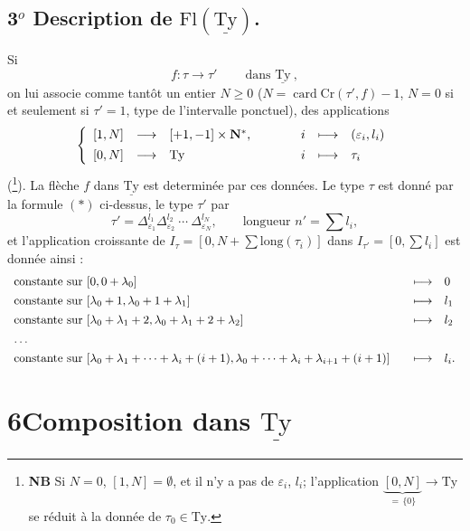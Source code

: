 \documentclass[11pt]{article}
\newcommand{\printedpage}[1]{\marginpar{\footnotesize p.~#1}}
\newcommand{\msp}[1]{\marginpar{\footnotesize [#1]}}
\newcommand{\Ty}{\mathrm{Ty}}
\newcommand{\uTy}{\underline{\mathrm{Ty}}}
\begin{document}
\subsection*{3$^o$ Description de $\mathrm{Fl}(\uTy)$.}

Si
\[
f : \tau \longrightarrow \tau' \qquad \ \text{dans } \uTy\ ,
\]
on lui associe comme tantôt un entier \underline{$N \geq 0$} ($N = \operatorname{card}\mathrm{Cr}(\tau', f){-}1$, $N = 0$ si et seulement si $\tau' = 1$, type de l'intervalle ponctuel), des applications
\[
\left\{
\begin{array}{lcl@{\qquad\qquad}ccl}
{[1,N]} & \longrightarrow & [+1,-1] \times \mathbf{N}^*, & i & \longmapsto & (\varepsilon_i, l_i) \\[1ex]
{[0,N]} & \longrightarrow & \Ty & i & \longmapsto & \tau_i
\end{array}
\right.
\]
(\footnote[14]{\textbf{NB} Si $N = 0$, $[1,N] = \emptyset$, et il n'y a pas de $\varepsilon_i$, $l_i$; l'application $\underbrace{[0,N]}_{=\,\{0\}} \longrightarrow \Ty$ se réduit à la donnée de $\tau_0 \in \Ty$.}). La flèche $f$ dans $\uTy$ est determinée par ces données. Le type $\tau$ est donné par la formule $(*)$ ci-dessus, le type $\tau'$ par %
\[
\tau' = \Delta^{l_1}_{\varepsilon_1} \Delta^{l_2}_{\varepsilon_2}\ \cdots\ \Delta^{l_N}_{\varepsilon_N}, \qquad \text{longueur } n' = \textstyle\sum l_i, \tag*{$(*')$}
\]
\printedpage{31}
et l'application croissante de $I_\tau = [0, N + \sum \mathrm{long}(\tau_i)]$ dans $I_{\tau'} = [0, \sum l_i]$ est donnée ainsi :
\[
\begin{array}{l@{\qquad}cl}
\text{constante sur } [0, 0+\lambda_0] & \longmapsto & 0 \\[1ex]
\text{constante sur } [\lambda_0+1, \lambda_0+1+\lambda_1] & \longmapsto & l_1 \\[1ex]
\text{constante sur } [\lambda_0+\lambda_1+2, \lambda_0+\lambda_1+2+\lambda_2] & \longmapsto & l_2 \\[1ex]
\ldots & & \\[1ex]
\text{constante sur } [\lambda_0+\lambda_1+\cdots+\lambda_i+(i+1), \lambda_0+\cdots+\lambda_i+\lambda_{i+1}+(i+1)] & \longmapsto & l_i.
\end{array}
\]

\printedpage{32}
\msp{page 48}

\section*{6\quad Composition dans $\uTy$}
\end{document}
